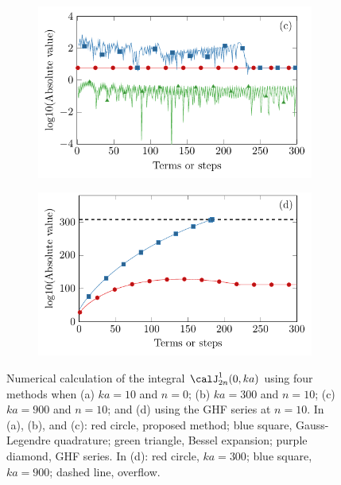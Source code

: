 \begin{figure}[!htb]
\begin{subfigure}{0.49\textwidth}
        \includegraphics[width = \textwidth]{fig/compare_jint_200421A_c_v2.pdf}
    \end{subfigure}
    \begin{subfigure}{0.49\textwidth}
        \centering
        \includegraphics[width = \textwidth]{fig/compare_jint_200421A_d_v2.pdf}
    \end{subfigure}
    \caption{Numerical calculation of the integral \ensuremath{\calJ_{2n}^1(0,ka)} using four methods when (a) $ka = 10$ and $n = 0$; (b) $ka = 300$ and $n = 10$; (c) $ka = 900$ and $n = 10$; and (d) using the GHF series at $n = 10$. {In (a), (b), and (c): red circle, proposed method; blue square, Gauss-Legendre quadrature; green triangle, Bessel expansion; purple diamond, GHF series. In (d): red circle, $ka = 300$; blue square, $ka=900$; dashed line, overflow.
    }}
    \label{fig:swe_piston_results}
\end{figure}

